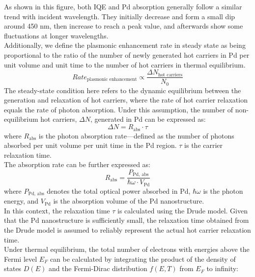 \documentclass[journal]{IEEEtran}
\begin{document}
\indent
As shown in this figure, both IQE and Pd absorption generally follow a similar trend with incident wavelength. They initially decrease and form a small dip around 450 nm, then increase to reach a peak value, and afterwards show some fluctuations at longer wavelengths.\\
\indent
Additionally, we define the plasmonic enhancement rate in steady state as being proportional to the ratio of the number of newly generated hot carriers in Pd per unit volume and unit time to the number of hot carriers in thermal equilibrium. \\
\indent
\begin{equation}
    Rate_{\text{plasmonic enhancement}} \propto \frac{\Delta
    N_{\text{hot carriers}}}{N_0}
    \label{eq:probability}
\end{equation}
\indent
The steady-state condition here refers to the dynamic equilibrium between the generation and relaxation of hot carriers, where the rate of hot carrier relaxation equals the rate of photon absorption. Under this assumption, the number of non-equilibrium hot carriers, \( \Delta N \), generated in Pd can be expressed as:
\begin{equation}
\Delta N = R_{\text{abs}} \cdot \tau
\label{eq:deltaN}
\end{equation}
\indent
where \( R_{\text{abs}} \) is the photon absorption rate—defined as the number of photons absorbed per unit volume per unit time in the Pd region.  \( \tau \) is the carrier relaxation time.\\
\indent
The absorption rate can be further expressed as:
\begin{equation}
R_{\text{abs}} = \frac{P_{\text{Pd, abs}}}{\hbar \omega \cdot V_{\text{Pd}}}
\label{eq:Rabs}
\end{equation}
\indent
where \( P_{\text{Pd, abs}} \) denotes the total optical power absorbed in Pd, \( \hbar \omega \) is the photon energy, and \( V_{\text{Pd}} \) is the absorption volume of the Pd nanostructure.\\
\indent
In this context, the relaxation time \( \tau \) is calculated using the Drude model. Given that the Pd nanostructure is sufficiently small, the relaxation time obtained from the Drude model is assumed to reliably represent the actual hot carrier relaxation time.\\
\indent
Under thermal equilibrium, the total number of electrons with energies above the Fermi level \( E_F \) can be calculated by integrating the product of the density of states \( D(E) \) and the Fermi-Dirac distribution \( f(E, T) \) from \( E_F \) to infinity:
\end{document}
